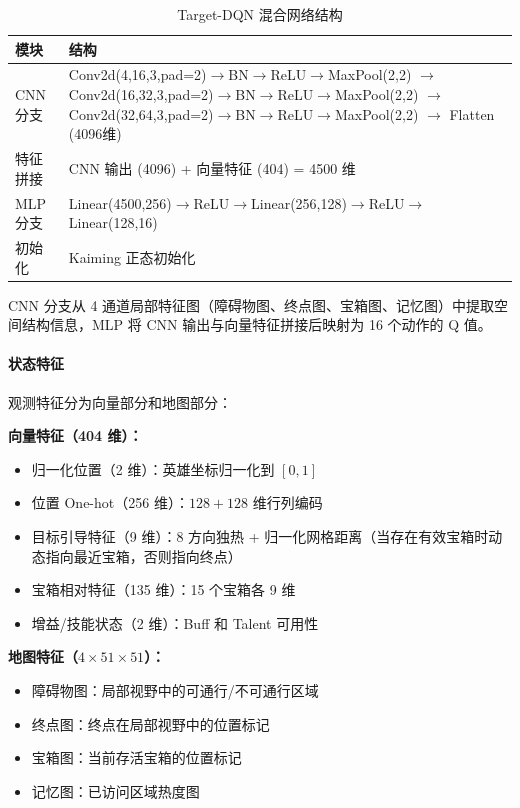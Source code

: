 \documentclass[12pt,a4paper]{article}
\begin{document}
\begin{table}[htbp]
\centering
\caption{Target-DQN 混合网络结构}\label{tab:hw2_net}
\begin{tabularx}{\textwidth}{lX}
\toprule
\textbf{模块} & \textbf{结构} \\
\midrule
CNN 分支 & Conv2d(4,16,3,pad=2)$\to$BN$\to$ReLU$\to$MaxPool(2,2) $\to$ Conv2d(16,32,3,pad=2)$\to$BN$\to$ReLU$\to$MaxPool(2,2) $\to$ Conv2d(32,64,3,pad=2)$\to$BN$\to$ReLU$\to$MaxPool(2,2) $\to$ Flatten (4096维) \\
特征拼接 & CNN 输出 (4096) + 向量特征 (404) = 4500 维 \\
MLP 分支 & Linear(4500,256)$\to$ReLU$\to$Linear(256,128)$\to$ReLU$\to$Linear(128,16) \\
初始化   & Kaiming 正态初始化 \\
\bottomrule
\end{tabularx}
\end{table}

CNN 分支从 4 通道局部特征图（障碍物图、终点图、宝箱图、记忆图）中提取空间结构信息，MLP 将 CNN 输出与向量特征拼接后映射为 16 个动作的 Q 值。

\paragraph{状态特征}
观测特征分为向量部分和地图部分：

\textbf{向量特征（404 维）：}
\begin{itemize}[nosep]
\item 归一化位置（2 维）：英雄坐标归一化到 $[0,1]$
\item 位置 One-hot（256 维）：$128+128$ 维行列编码
\item 目标引导特征（9 维）：8 方向独热 + 归一化网格距离（当存在有效宝箱时动态指向最近宝箱，否则指向终点）
\item 宝箱相对特征（135 维）：15 个宝箱各 9 维
\item 增益/技能状态（2 维）：Buff 和 Talent 可用性
\end{itemize}

\textbf{地图特征（$4\times51\times51$）：}
\begin{itemize}[nosep]
\item 障碍物图：局部视野中的可通行/不可通行区域
\item 终点图：终点在局部视野中的位置标记
\item 宝箱图：当前存活宝箱的位置标记
\item 记忆图：已访问区域热度图
\end{itemize}
\end{document}
